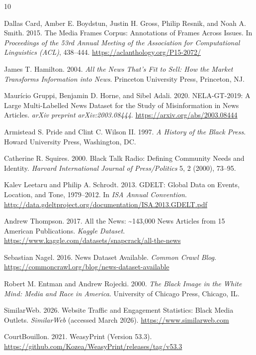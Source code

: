 \documentclass[sigconf,anonymous,review]{acmart}
\begin{document}

\begin{thebibliography}{10}

Dallas Card, Amber E. Boydstun, Justin H. Gross, Philip Resnik, and Noah A. Smith. 2015.
The Media Frames Corpus: Annotations of Frames Across Issues.
In \textit{Proceedings of the 53rd Annual Meeting of the Association for Computational
Linguistics (ACL)}, 438--444.
\url{https://aclanthology.org/P15-2072/}

James T. Hamilton. 2004.
\textit{All the News That's Fit to Sell: How the Market Transforms Information into News}.
Princeton University Press, Princeton, NJ.

Maurício Gruppi, Benjamin D. Horne, and Sibel Adali. 2020.
NELA-GT-2019: A Large Multi-Labelled News Dataset for the Study of Misinformation
in News Articles.
\textit{arXiv preprint arXiv:2003.08444}.
\url{https://arxiv.org/abs/2003.08444}

Armistead S. Pride and Clint C. Wilson II. 1997.
\textit{A History of the Black Press}.
Howard University Press, Washington, DC.

Catherine R. Squires. 2000.
Black Talk Radio: Defining Community Needs and Identity.
\textit{Harvard International Journal of Press/Politics} 5, 2 (2000), 73--95.

Kalev Leetaru and Philip A. Schrodt. 2013.
GDELT: Global Data on Events, Location, and Tone, 1979--2012.
In \textit{ISA Annual Convention}.
\url{http://data.gdeltproject.org/documentation/ISA.2013.GDELT.pdf}

Andrew Thompson. 2017.
All the News: \textasciitilde143,000 News Articles from 15 American Publications.
\textit{Kaggle Dataset}.
\url{https://www.kaggle.com/datasets/snapcrack/all-the-news}

Sebastian Nagel. 2016.
News Dataset Available.
\textit{Common Crawl Blog}.
\url{https://commoncrawl.org/blog/news-dataset-available}

Robert M. Entman and Andrew Rojecki. 2000.
\textit{The Black Image in the White Mind: Media and Race in America}.
University of Chicago Press, Chicago, IL.

SimilarWeb. 2026.
Website Traffic and Engagement Statistics: Black Media Outlets.
\textit{SimilarWeb} (accessed March 2026).
\url{https://www.similarweb.com}

CourtBouillon. 2021.
WeasyPrint (Version 53.3).
\url{https://github.com/Kozea/WeasyPrint/releases/tag/v53.3}

\end{thebibliography}
\end{document}
